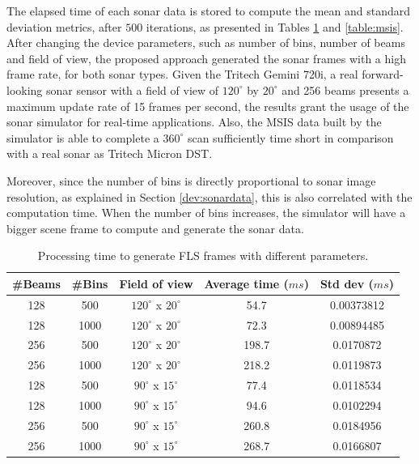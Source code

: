 \documentclass[final,5p,times]{elsarticle}
\begin{document}
The elapsed time of each sonar data is stored to compute the mean and standard deviation metrics, after $500$ iterations, as presented in Tables \ref{table:fls} and \ref{table:msis}. After changing the device parameters, such as number of bins, number of beams and field of view, the proposed approach generated the sonar frames with a high frame rate, for both sonar types. Given the Tritech Gemini 720i, a real forward-looking sonar sensor with a field of view of $120^{\circ}$ by $20^{\circ}$ and 256 beams presents a maximum update rate of 15 frames per second, the results grant the usage of the sonar simulator for real-time applications. Also, the MSIS data built by the simulator is able to complete a $360^{\circ}$ scan sufficiently time short in comparison with a real sonar as Tritech Micron DST.

Moreover, since the number of bins is directly proportional to sonar image resolution, as explained in Section \ref{dev:sonardata}, this is also correlated with the computation time. When the number of bins increases, the simulator will have a bigger scene frame to compute and generate the sonar data.

\begin{table}[!h]
    \caption{Processing time to generate FLS frames with different parameters.}
    \label{table:fls}
    \begin{center}
        \begin{tabular}{| c | c | c | c | c |}
            \hline
            \#Beams & \#Bins & Field of view & Average time ($ms$) & Std dev ($ms$) \\
            \hline
            128     & 500       & $120^{\circ}$ x $20^{\circ}$        & 54.7   & 0.00373812  \\ \hline
            128     & 1000      & $120^{\circ}$ x $20^{\circ}$        & 72.3	& 0.00894485  \\ \hline
            256     & 500       & $120^{\circ}$ x $20^{\circ}$        & 198.7	    & 0.0170872   \\ \hline
            256     & 1000      & $120^{\circ}$ x $20^{\circ}$        & 218.2	& 0.0119873   \\ \hline
            128     & 500       & $90^{\circ}$ x $15^{\circ}$         & 77.4	& 0.0118534   \\ \hline
            128     & 1000      & $90^{\circ}$ x $15^{\circ}$         & 94.6	& 0.0102294   \\ \hline
            256     & 500       & $90^{\circ}$ x $15^{\circ}$         & 260.8	& 0.0184956   \\ \hline
            256     & 1000      & $90^{\circ}$ x $15^{\circ}$         & 268.7	    & 0.0166807   \\ \hline
        \end{tabular}
    \end{center}
\end{table}
\end{document}
